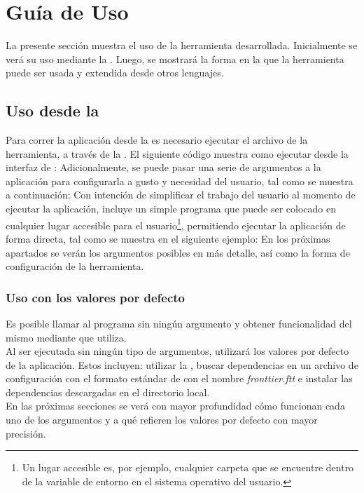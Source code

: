 \section{Guía de Uso}
\label{sec:guide}

La presente sección muestra el uso de la herramienta desarrollada. Inicialmente 
se verá su uso mediante la \cli. Luego, se mostrará la forma en la que la 
herramienta puede ser usada y extendida desde otros lenguajes.\\


\subsection{Uso desde la \cli}
\label{subsec:guide:cli}

Para correr la aplicación desde la \cli es necesario ejecutar el archivo \jar
de la herramienta, a través de la \jvm.
El siguiente código muestra como ejecutar \fronttier desde la interfaz de \cli:
Adicionalmente, se puede pasar una serie de argumentos a la aplicación para 
configurarla a gusto y necesidad del usuario, tal como se muestra a 
continuación:
Con intención de simplificar el trabajo del usuario al momento de ejecutar la
aplicación, \fronttier incluye un simple programa que puede ser colocado en 
cualquier lugar accesible para el usuario\footnote{
	Un lugar accesible es, por ejemplo, cualquier carpeta que se
	encuentre dentro de la variable de entorno  en el sistema
	operativo del usuario.
}, permitiendo ejecutar la aplicación de forma directa, tal como se muestra en 
el siguiente ejemplo:
En los próximas apartados se verán los argumentos posibles en más detalle, así 
como la forma de configuración de la herramienta.

\subsubsection{Uso con los valores por defecto}
\label{subsubsec:guide:defaults}

Es posible llamar al programa sin ningún argumento y obtener funcionalidad del 
mismo mediante  que \fronttier utiliza.\\
Al ser ejecutada sin ningún tipo de argumentos, \fronttier utilizará los 
valores por defecto de la aplicación. Estos incluyen: utilizar la \cacheg, 
buscar dependencias en un archivo de configuración con el formato estándar de 
\fronttier con el nombre \emph{fronttier.ftt} e instalar las dependencias 
descargadas en el directorio local.\\
En las próximas secciones se verá con mayor profundidad cómo funcionan cada uno 
de los argumentos y a qué refieren los valores por defecto con mayor precisión.

